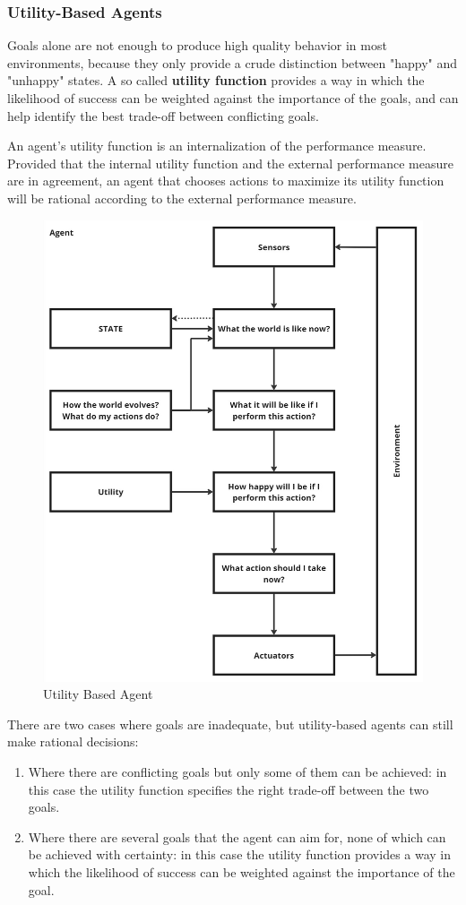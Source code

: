 \documentclass{article}
\begin{document}
\subsubsection{Utility-Based Agents}
Goals alone are not enough to produce high quality behavior in most environments, because they only provide a crude distinction between "happy" and "unhappy" states. A so called \textbf{utility function} provides a way in which the likelihood of success can be weighted against the importance of the goals, and can help identify the best trade-off between conflicting goals.

An agent's utility function is an internalization of the performance measure. Provided that the internal utility function and the external performance measure are in agreement, an agent that chooses actions to maximize its utility function will be rational according to the external performance measure. 

\clearpage
\begin{figure}[h]
    \centering
    \includegraphics[width=0.5\linewidth]{images/Utility Based Agent.jpg}
    \caption{Utility Based Agent}
    \label{fig:utility_based_agent}
\end{figure}

There are two cases where goals are inadequate, but utility-based agents can still make rational decisions:
\begin{enumerate}
    \item Where there are conflicting goals but only some of them can be achieved: in this case the utility function specifies the right trade-off between the two goals.
    \item Where there are several goals that the agent can aim for, none of which can be achieved with certainty: in this case the utility function provides a way in which the likelihood of success can be weighted against the importance of the goal.
\end{enumerate}
\end{document}
